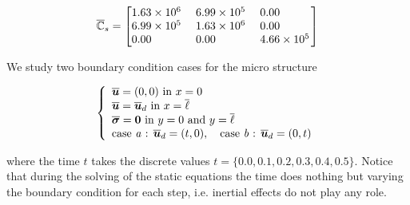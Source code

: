 \documentclass[preprint]{elsarticle}
\begin{document}
\begin{equation}
  \overline{\mathbb{C}}_s = 
  \begin{bmatrix}
   \begin{tabular}{ @{}*{3}{S[round-mode=places,
                    round-integer-to-decimal,round-precision=2,
                    table-format=1.2e4,table-column-width=16mm,table-number-alignment=center]}@{}
		  }
    1.630150e+06 & 6.986357e+05 & 0.0\\
    6.986357e+05 & 1.630150e+06 & 0.0\\
    0.0          & 0.0          & 4.657572e+05
   \end{tabular}
  \end{bmatrix}
\end{equation}

We study two boundary condition cases for the micro structure

\begin{equation}
\left\{
\begin{array}{ll}
\overline{\bm{u}} = (0,0) \text{ in } x=0\\
\overline{\bm{u}} = \overline{\bm{u}}_d \text{ in } x=\overline{\ell}\\
\overline{\bm{\sigma}} = \bm{0} \text{ in } y=0\text{ and }y=\overline{\ell}\\
\text{case \emph{a} : } \overline{\bm{u}}_d = (t,0) , \quad
\text{case \emph{b} : } \overline{\bm{u}}_d = (0,t)
\end{array}
\right.
\label{micro_eqs}
\end{equation}

\noindent
where the time $t$ takes the discrete values $t = \{ \SI{0.0}, \SI{0.1}, \SI{0.2}, \SI{0.3}, \SI{0.4}, \SI{0.5} \}$.
Notice that during the solving of the static equations the time does nothing but varying the boundary condition
for each step, i.e. inertial effects do not play any role.
\end{document}
